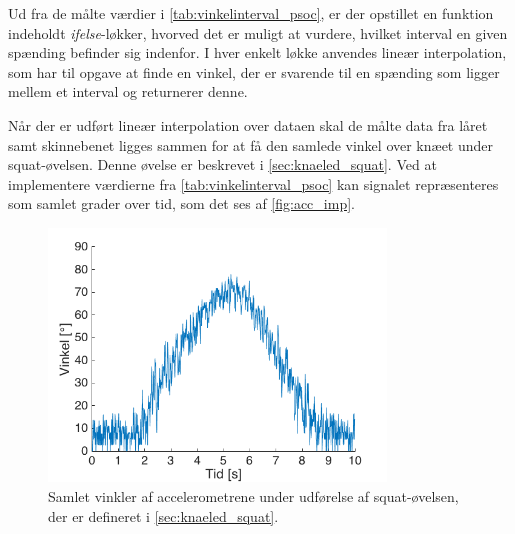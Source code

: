 Ud fra de målte værdier i \autoref{tab:vinkelinterval_psoc}, er der opstillet en funktion indeholdt \textit{ifelse}-løkker, hvorved det er muligt at vurdere, hvilket interval en given spænding befinder sig indenfor. I hver enkelt løkke anvendes lineær interpolation, som har til opgave at finde en vinkel, der er svarende til en spænding som ligger mellem et interval og returnerer denne. 

Når der er udført lineær interpolation over dataen skal de målte data fra låret samt skinnebenet ligges sammen for at få den samlede vinkel over knæet under squat-øvelsen. Denne øvelse er beskrevet i \autoref{sec:knaeled_squat}.
Ved at implementere værdierne fra \autoref{tab:vinkelinterval_psoc} kan signalet repræsenteres som samlet grader over tid, som det ses af \autoref{fig:acc_imp}.
 

\begin{figure}[H]
\centering
\includegraphics[width=0.8\textwidth]{figures/Pilotforsoeg/accvinkel}
\caption{Samlet vinkler af accelerometrene under udførelse af squat-øvelsen, der er defineret i \autoref{sec:knaeled_squat}.}
\label{fig:acc_imp}
\end{figure}



